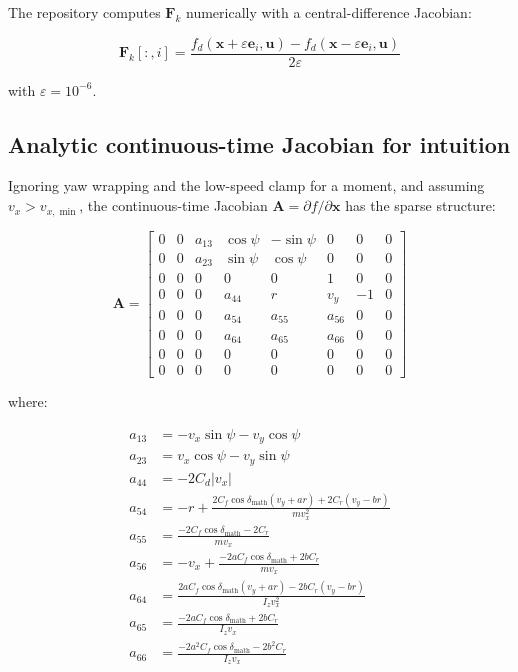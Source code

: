 \documentclass[11pt]{article}
\newcommand{\vect}[1]{\boldsymbol{#1}}
\newcommand{\mat}[1]{\mathbf{#1}}
\begin{document}
The repository computes $\mat{F}_k$ numerically with a central-difference Jacobian:

\begin{equation}
\mat{F}_k[:,i] =
\frac{
f_d(\vect{x} + \varepsilon\vect{e}_i,\vect{u}) -
f_d(\vect{x} - \varepsilon\vect{e}_i,\vect{u})
}{2\varepsilon}
\end{equation}

with $\varepsilon = 10^{-6}$.

\subsection{Analytic continuous-time Jacobian for intuition}
\label{sec:analytic_jacobian}

Ignoring yaw wrapping and the low-speed clamp for a moment, and assuming $v_x > v_{x,\min}$, the continuous-time Jacobian $\mat{A} = \partial f / \partial \vect{x}$ has the sparse structure:

\begin{equation}
\mat{A} =
\begin{bmatrix}
0 & 0 & a_{13} & \cos\psi & -\sin\psi & 0 & 0 & 0 \\
0 & 0 & a_{23} & \sin\psi & \cos\psi & 0 & 0 & 0 \\
0 & 0 & 0 & 0 & 0 & 1 & 0 & 0 \\
0 & 0 & 0 & a_{44} & r & v_y & -1 & 0 \\
0 & 0 & 0 & a_{54} & a_{55} & a_{56} & 0 & 0 \\
0 & 0 & 0 & a_{64} & a_{65} & a_{66} & 0 & 0 \\
0 & 0 & 0 & 0 & 0 & 0 & 0 & 0 \\
0 & 0 & 0 & 0 & 0 & 0 & 0 & 0
\end{bmatrix}
\end{equation}

where:

\begin{align}
a_{13} &= -v_x\sin\psi - v_y\cos\psi \\
a_{23} &= v_x\cos\psi - v_y\sin\psi \\
a_{44} &= -2C_d|v_x| \\
a_{54} &= -r + \frac{2C_f\cos\delta_{\text{math}}(v_y + ar) + 2C_r(v_y - br)}{m v_x^2} \\
a_{55} &= \frac{-2C_f\cos\delta_{\text{math}} - 2C_r}{m v_x} \\
a_{56} &= -v_x + \frac{-2aC_f\cos\delta_{\text{math}} + 2bC_r}{m v_x} \\
a_{64} &= \frac{2aC_f\cos\delta_{\text{math}}(v_y + ar) - 2bC_r(v_y - br)}{I_z v_x^2} \\
a_{65} &= \frac{-2aC_f\cos\delta_{\text{math}} + 2bC_r}{I_z v_x} \\
a_{66} &= \frac{-2a^2C_f\cos\delta_{\text{math}} - 2b^2C_r}{I_z v_x}
\end{align}
\end{document}
